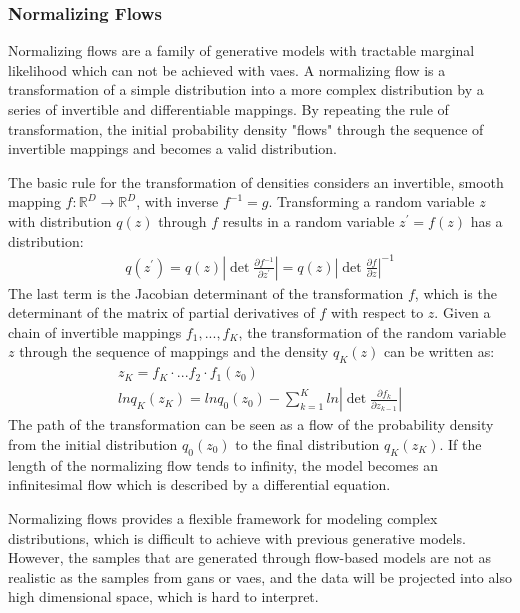 \documentclass[12pt,DIV14,BCOR12mm,a4paper,footinclude=false,headinclude,parskip=half-,twoside,openright,cleardoublepage=empty,toc=index,bibliography=totoc,listof=totoc]{scrreprt}
\numberwithin{equation}{chapter}
\begin{document}
\subsubsection{Normalizing Flows}
Normalizing flows \cite{rezende2016variational} are a family of generative models with tractable marginal likelihood which can not be achieved with \glspl{vae}. A normalizing flow is a transformation of a simple distribution into a more complex distribution by a series of invertible and differentiable mappings. By repeating the rule of transformation, the initial probability density "flows" through the sequence of invertible mappings and becomes a valid distribution.

The basic rule for the transformation of densities considers an invertible, smooth mapping $f: \mathbb{R}^{D} \rightarrow \mathbb{R}^{D}$, with inverse $f^{-1} = g$. Transforming a random variable $z$ with distribution $q(z)$ through $f$ results in a random variable $z^{'}  = f(z)$ has a distribution:
\begin{align}
  q(z^{'}) = q(z) \left| \det \frac{\partial f^{-1}}{\partial z^{'}} \right| = q(z) \left| \det \frac{\partial f}{\partial z} \right|^{-1}
\end{align}
The last term is the Jacobian determinant of the transformation $f$, which is the determinant of the matrix of partial derivatives of $f$ with respect to $z$. Given a chain of invertible mappings $f_{1},...,f_{K}$, the transformation of the random variable $z$ through the sequence of mappings and the density $q_{K}(z)$ can be written as:
\begin{gather}
  z_{K} = f_{K} \cdot ... f_{2} \cdot f_{1}(z_{0})\\
  lnq_{K}(z_{K}) = lnq_{0}(z_{0}) - \sum_{k=1}^{K} ln \left| \det \frac{\partial f_{k}}{\partial z_{k-1}} \right|
\end{gather}
The path of the transformation can be seen as a flow of the probability density from the initial distribution $q_{0}(z_{0})$ to the final distribution $q_{K}(z_{K})$. If the length of the normalizing flow tends to infinity, the model becomes an infinitesimal flow which is described by a differential equation.

Normalizing flows provides a flexible framework for modeling complex distributions, which is difficult to achieve with previous generative models. However, the samples that are generated through flow-based models are not as realistic as the samples from \glspl{gan} or \glspl{vae}, and the data will be projected into also high dimensional space, which is hard to interpret.
\end{document}
